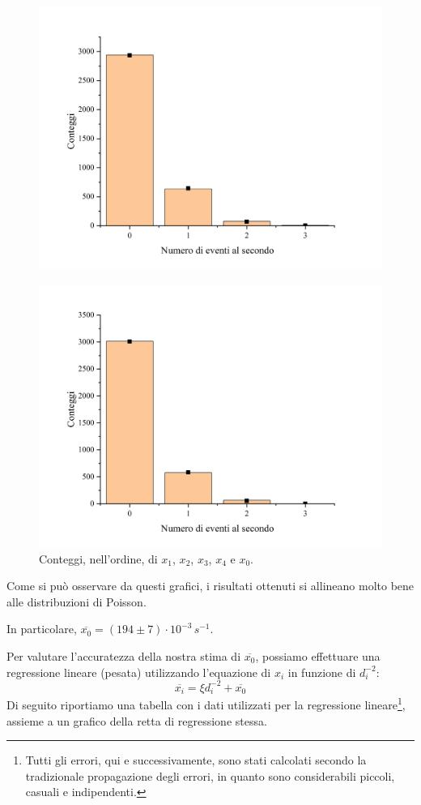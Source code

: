 \documentclass{article}
\begin{document}
\begin{center}
\begin{figure}[H]
        \includegraphics[trim={2cm .5cm 2.4cm 2.1cm},clip,width=.5\textwidth]{img/Geiger5.jpg}
    \end{figure}\begin{figure}[H]
        \centering
        \includegraphics[trim={2cm .5cm 2.4cm 2.1cm},clip,width=.5\textwidth]{img/Geiger0.jpg}
        \caption*{Conteggi, nell'ordine, di $x_1$, $x_2$, $x_3$, $x_4$ e $x_0$.}
    \end{figure}
\end{center}

Come si può osservare da questi grafici, i risultati ottenuti si allineano molto bene
alle distribuzioni di Poisson.

In particolare, $\overline{x_0} = \left(194\pm7\right)\cdot10^{-3}\,\unit{s^{-1}}$.

Per valutare l'accuratezza della nostra stima di $\overline{x_0}$, possiamo effettuare
una regressione lineare (pesata) utilizzando l'equazione di $x_i$ in funzione di
$d_i^{-2}$: \[\overline{x_i} = \xi d_i^{-2} + \overline{x_0}\]
Di seguito riportiamo una tabella con i dati utilizzati per la regressione lineare\footnote{
    Tutti gli errori, qui e successivamente, sono stati calcolati secondo la tradizionale
    propagazione degli errori, in quanto sono considerabili piccoli, casuali e indipendenti.
}, assieme a un grafico della retta di regressione stessa.
\end{document}
